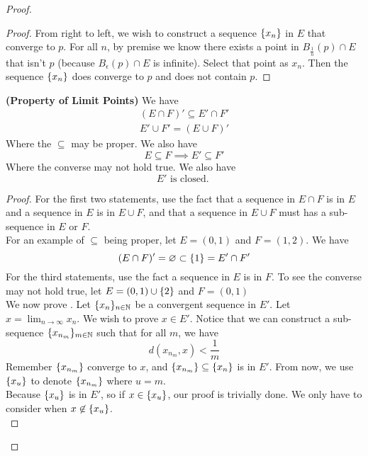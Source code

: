 \documentclass{report}
\begin{document}
\begin{proof}
\begin{proof}
From right to left, we wish to construct a sequence $\{ x_n \}$ in $E$ that converge to $p$. For all $n$, by premise we know there exists a point in  $B_{\frac{1}{n}}(p)\cap E$ that isn't $p$  (because $B_{\epsilon }(p)\cap E$ is infinite). Select that point as $x_n$. Then the sequence $\{ x_n \}$ does converge to $p$ and does not contain $p$.
\end{proof}
\begin{theorem}
\label{1.2.10}
\textbf{(Property of Limit Points)} We have
\begin{gather}
(E\cap F)'\subseteq E'\cap F'\\
E'\cup F'=(E\cup F)'
\end{gather}
Where the $\subseteq$ may be proper. We also have
\begin{equation}
E\subseteq F\implies E'\subseteq F'
\end{equation}
Where the converse may not hold true. We also have
\begin{equation}
E'\text{ is closed. }
\end{equation}
\end{theorem}
\begin{proof}
For the first two statements, use the fact that a sequence in $E\cap F$ is in $E$ and a sequence in  $E$ is in $E\cup F$, and that a sequence in $E\cup F$ must has a sub-sequence in $E$ or $F$.\\

For an example of $\subseteq$ being proper, let $E=(0,1)$ and $F=(1,2)$. We have 
\begin{equation}
  (E\cap F)'=\varnothing \subset \{ 1 \}=E'\cap F'
\end{equation}
For the third statements, use the fact a sequence in $E$ is in $F$. To see the converse may not hold true, let $E=(0,1)\cup \{ 2 \}$ and $F=(0,1)$\\

We now prove . Let $\{ x_n \}_{n\in\mathbb{N}}$ be a convergent sequence in $E'$. Let $x=\lim_{n\to\infty} x_n$. We wish to prove $x\in E'$. Notice that we can construct a sub-sequence $\{ x_{n_m} \}_{m \in\mathbb{N}}$ such that for all $m$, we have 
 \begin{equation}
d(x_{n_m},x)<\frac{1}{m}
\end{equation}
Remember $\{ x_{n_m} \}$ converge to $x$, and $\{ x_{n_m} \}\subseteq \{ x_n \}$ is in $E'$. From now, we use $\{ x_u \}$ to denote $\{ x_{n_m} \}$ where $u=m$.\\ 

Because $\{ x_u \}$ is in $E'$, so if  $x\in \{ x_u \}$, our proof is trivially done. We only have to consider when $x\not\in \{ x_u \}$.\\


\end{proof}
\end{proof}
\end{document}

